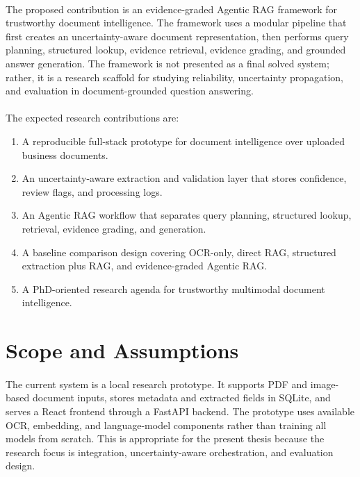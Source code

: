 \paragraph{} The proposed contribution is an evidence-graded Agentic RAG framework for trustworthy document intelligence. The framework uses a modular pipeline that first creates an uncertainty-aware document representation, then performs query planning, structured lookup, evidence retrieval, evidence grading, and grounded answer generation. The framework is not presented as a final solved system; rather, it is a research scaffold for studying reliability, uncertainty propagation, and evaluation in document-grounded question answering.

\paragraph{} The expected research contributions are:

\begin{enumerate}
    \item A reproducible full-stack prototype for document intelligence over uploaded business documents.
    \item An uncertainty-aware extraction and validation layer that stores confidence, review flags, and processing logs.
    \item An Agentic RAG workflow that separates query planning, structured lookup, retrieval, evidence grading, and generation.
    \item A baseline comparison design covering OCR-only, direct RAG, structured extraction plus RAG, and evidence-graded Agentic RAG.
    \item A PhD-oriented research agenda for trustworthy multimodal document intelligence.
\end{enumerate}

\section{Scope and Assumptions}
\paragraph{} The current system is a local research prototype. It supports PDF and image-based document inputs, stores metadata and extracted fields in SQLite, and serves a React frontend through a FastAPI backend. The prototype uses available OCR, embedding, and language-model components rather than training all models from scratch. This is appropriate for the present thesis because the research focus is integration, uncertainty-aware orchestration, and evaluation design.

